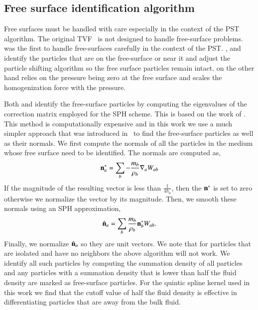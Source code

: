 \subsection{Free surface identification algorithm}
\label{subsec:free-surface}

Free surfaces must be handled with care especially in the context of the PST
algorithm. The original TVF~\citep{Adami2013} is not designed to handle
free-surface problems. \cite{diff_smoothing_sph:lind:jcp:2012} was the first
to handle free-surfaces carefully in the context of the PST.
\cite{diff_smoothing_sph:lind:jcp:2012,oger_ale_sph_2016}, and
\cite{sun_consistent_2019} identify the particles that are on the
free-surface or near it and adjust the particle shifting algorithm so the free
surface particles remain intact. \cite{zhang_hu_adams17} on the other hand
relies on the pressure being zero at the free surface and scales the
homogenization force with the pressure.

Both \citep{oger_ale_sph_2016} and \citep{sun_consistent_2019} identify the
free-surface particles by computing the eigenvalues of the correction matrix
employed for the SPH scheme. This is based on the work of
\citep{marrone:sph:level-set:2010}. This method is computationally expensive
and in this work we use a much simpler approach that was introduced
in~\citep{muta_efficient_2020} to find the free-surface particles as well as
their normals. We first compute the normals of all the particles in the medium
whose free surface need to be identified. The normals are computed as,
\begin{equation}
  \label{eq:normal-approx}
  \mathbf{n}^*_a = \sum_b -\frac{m_b}{\rho_b} \nabla_a W_{ab}
\end{equation}
%
If the magnitude of the resulting vector is less than $\frac{1}{4h_a}$, then
the $\mathbf{n}^*$ is set to zero otherwise we normalize the vector by its
magnitude. Then, we smooth these normals using an SPH approximation,
\begin{equation}
  \label{eq:normal}
  \hat{\mathbf{n}}_a = \sum_b \frac{m_b}{\rho_b}\mathbf{n}^*_b W_{ab}.
\end{equation}
Finally, we normalize $\hat{\mathbf{n}}_a$ so they are unit vectors. We note that
for particles that are isolated and have no neighbors the above algorithm will
not work. We identify all such particles by computing the summation density of
all particles and any particles with a summation density that is lower than
half the fluid density are marked as free-surface particles. For the quintic
spline kernel used in this work we find that the cutoff value of half the
fluid density is effective in differentiating particles that are away from the
bulk fluid.

